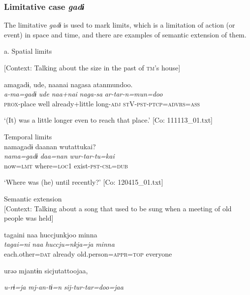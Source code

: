 \begin{table}
\subsubsection{ Limitative case \textit{gadɨ}}

The limitative \textit{gadɨ} is used to mark limits, which is a limitation of action (or event) in space and time, and there are examples of semantic extension of them.

\ea\label{ex:6-76}
  a. Spatial limits

  [Context: Talking about the size in the past of \textsc{tm}’s house]

{\TM}
\glll amagadɨ,  ude,  naanai  nagasa  atanmundoo.\\
\textit{a-ma=gadɨ}  \textit{ude}  \textit{naa+nai}  \textit{naga-sa}  \textit{ar-tar-n=mun=doo}\\

    \textsc{prox}-place  well  already+little  long-\textsc{adj}  \textsc{st}V-\textsc{pst}-\textsc{ptcp}=\textsc{advrs}=\textsc{ass}

\glt    ‘(It) was a little longer even to reach that place.’ [Co: 111113\_01.txt]
\z

\ex Temporal limits\\

{\TM}
\glll namagadɨ  daanan  wutattukai?\\
\textit{nama=gadɨ}  \textit{daa=nan}  \textit{wur-tar-tu=kai}\\

    now=\textsc{lmt}  where=\textsc{loc}1  exist-\textsc{pst}-\textsc{csl}=\textsc{dub}

\glt    ‘Where was (he) until recently?’ [Co: 120415\_01.txt]
\z

\ex Semantic extension\\

  [Context: Talking about a song that used to be sung when a meeting of old people was held]

{\TM}
\glll {\textbar}tagaini{\textbar}  naa  huccjunkjoo  minna\\
\textit{tagai=ni}  \textit{naa}  \textit{huccju=nkja=ja}  \textit{minna}\\

    each.other=\textsc{dat}  already  old.person=\textsc{appr}=\textsc{top}  everyone

    urəə  mjantɨn  sicjutattoojaa,

    \textit{u-rɨ=ja}  \textit{mj-an-tɨ=n}  \textit{sij-tur-tar=doo=jaa}


\end{table}
